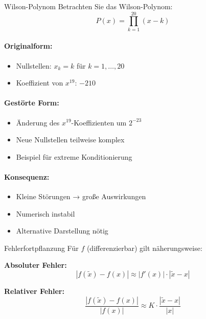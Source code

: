 \begin{example2}{Wilson-Polynom}
Betrachten Sie das Wilson-Polynom:
$$P(x) = \prod_{k=1}^{20} (x-k)$$

\paragraph{Originalform:}
\begin{itemize}
    \item Nullstellen: $x_k = k$ für $k = 1,\ldots,20$
    \item Koeffizient von $x^{19}$: $-210$
\end{itemize}

\paragraph{Gestörte Form:}
\begin{itemize}
    \item Änderung des $x^{19}$-Koeffizienten um $2^{-23}$
    \item Neue Nullstellen teilweise komplex
    \item Beispiel für extreme Konditionierung
\end{itemize}

\paragraph{Konsequenz:}
\begin{itemize}
    \item Kleine Störungen → große Auswirkungen
    \item Numerisch instabil
    \item Alternative Darstellung nötig
\end{itemize}
\end{example2}

\begin{theorem}{Fehlerfortpflanzung}
Für $f$ (differenzierbar) gilt näherungsweise:
\vspace{1mm}\\
\begin{minipage}[t]{0.47\textwidth}
    \textbf{Absoluter Fehler:}  
    \vspace{-2mm}\\
    $$|f(\tilde{x})-f(x)| \approx |f'(x)| \cdot |\tilde{x}-x|$$
\end{minipage}
\hspace{3mm}
\begin{minipage}[t]{0.43\textwidth}
    \textbf{Relativer Fehler:}  
    \vspace{-2mm}\\
    $$\frac{|f(\tilde{x})-f(x)|}{|f(x)|} \approx K \cdot \frac{|\tilde{x}-x|}{|x|}$$
\end{minipage}
\end{theorem}

